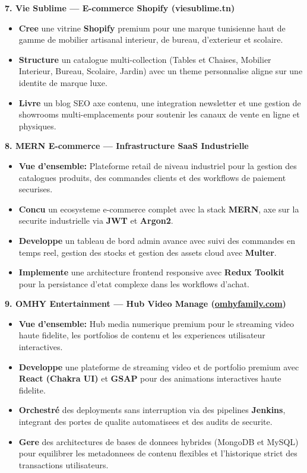 \documentclass[10pt, letterpaper]{article}
\newenvironment{highlights}{
\begin{itemize}[leftmargin=12pt, itemsep=2pt]
}{
\end{itemize}
}
\begin{document}
\textbf{7. Vie Sublime --- E-commerce Shopify (viesublime.tn)}
\begin{highlights}
\item \textbf{Cree} une vitrine \textbf{Shopify} premium pour une marque tunisienne haut de gamme de mobilier artisanal interieur, de bureau, d'exterieur et scolaire.
\item \textbf{Structure} un catalogue multi-collection (Tables et Chaises, Mobilier Interieur, Bureau, Scolaire, Jardin) avec un theme personnalise aligne sur une identite de marque luxe.
\item \textbf{Livre} un blog SEO axe contenu, une integration newsletter et une gestion de showrooms multi-emplacements pour soutenir les canaux de vente en ligne et physiques.
\end{highlights}

\textbf{8. MERN E-commerce --- Infrastructure SaaS Industrielle}
\begin{highlights}
\item \textbf{Vue d'ensemble:} Plateforme retail de niveau industriel pour la gestion des catalogues produits, des commandes clients et des workflows de paiement securises.
\item \textbf{Concu} un ecosysteme e-commerce complet avec la stack \textbf{MERN}, axe sur la securite industrielle via \textbf{JWT} et \textbf{Argon2}.
\item \textbf{Developpe} un tableau de bord admin avance avec suivi des commandes en temps reel, gestion des stocks et gestion des assets cloud avec \textbf{Multer}.
\item \textbf{Implemente} une architecture frontend responsive avec \textbf{Redux Toolkit} pour la persistance d'etat complexe dans les workflows d'achat.
\end{highlights}

\textbf{9. OMHY Entertainment --- Hub Video Manage (\href{https://www.omhyfamily.com/}{omhyfamily.com})}
\begin{highlights}
\item \textbf{Vue d'ensemble:} Hub media numerique premium pour le streaming video haute fidelite, les portfolios de contenu et les experiences utilisateur interactives.
\item \textbf{Developpe} une plateforme de streaming video et de portfolio premium avec \textbf{React (Chakra UI)} et \textbf{GSAP} pour des animations interactives haute fidelite.
\item \textbf{Orchestré} des deployments sans interruption via des pipelines \textbf{Jenkins}, integrant des portes de qualite automatisees et des audits de securite.
\item \textbf{Gere} des architectures de bases de donnees hybrides (MongoDB et MySQL) pour equilibrer les metadonnees de contenu flexibles et l'historique strict des transactions utilisateurs.
\end{highlights}
\end{document}
